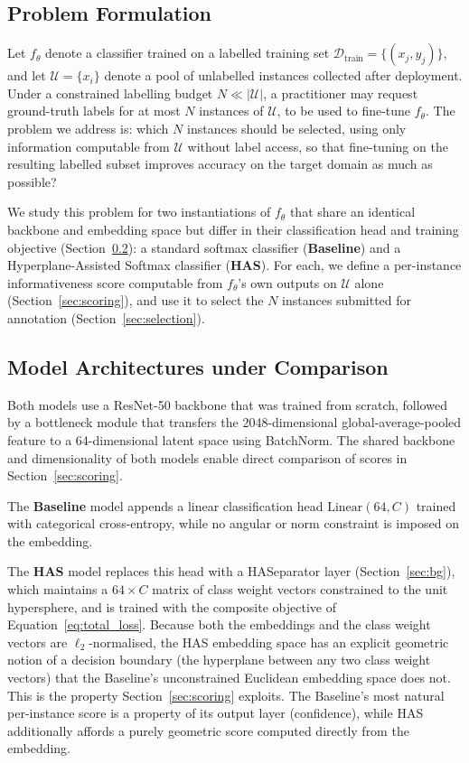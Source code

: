 

\subsection{Problem Formulation}
\label{sec:problem}

Let $f_\theta$ denote a classifier trained on a labelled training set
$\mathcal{D}_{\mathrm{train}} = \{(x_j, y_j)\}$, and let
$\mathcal{U} = \{x_i\}$ denote a pool of unlabelled instances collected
after deployment. Under a constrained labelling budget $N \ll
|\mathcal{U}|$, a practitioner may request ground-truth labels for at
most $N$ instances of $\mathcal{U}$, to be used to fine-tune $f_\theta$.
The problem we address is: which $N$ instances should be selected, using
only information computable from $\mathcal{U}$ without label access, so
that fine-tuning on the resulting labelled subset improves accuracy on
the target domain as much as possible?

We study this problem for two instantiations of $f_\theta$ that share an
identical backbone and embedding space but differ in their
classification head and training objective (Section~\ref{sec:models}): a
standard softmax classifier (\textbf{Baseline}) and a Hyperplane-Assisted
Softmax classifier (\textbf{HAS}). For each, we define a per-instance
informativeness score computable from $f_\theta$'s own outputs on
$\mathcal{U}$ alone (Section~\ref{sec:scoring}), and use it to select the
$N$ instances submitted for annotation (Section~\ref{sec:selection}).

\subsection{Model Architectures under Comparison}
\label{sec:models}

Both models use a ResNet-50 backbone that was trained from scratch, followed 
by a bottleneck module that transfers the 2048-dimensional global-average-pooled 
feature to a 64-dimensional latent space using BatchNorm. The shared backbone and 
dimensionality of both models enable direct comparison of scores in 
Section~\ref{sec:scoring}.

The \textbf{Baseline} model appends a linear classification head
$\mathrm{Linear}(64, C)$ trained with categorical cross-entropy, while no
angular or norm constraint is imposed on the embedding.

The \textbf{HAS} model replaces this head with a HASeparator layer
(Section~\ref{sec:bg}), which maintains a $64 \times C$ matrix of class
weight vectors constrained to the unit hypersphere, and is trained with
the composite objective of Equation~\ref{eq:total_loss}. Because both
the embeddings and the class weight vectors are $\ell_2$-normalised, the
HAS embedding space has an explicit geometric notion of a decision
boundary (the hyperplane between any two class weight vectors) that the
Baseline's unconstrained Euclidean embedding space does not. This is the
property Section~\ref{sec:scoring} exploits. The Baseline's most natural
per-instance score is a property of its output layer (confidence), while
HAS additionally affords a purely geometric score computed directly from
the embedding.

